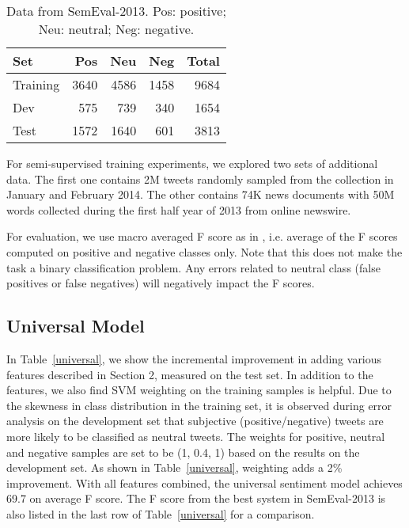 \documentclass[11pt]{article}
\begin{document}
\begin{table}[h]
\begin{center}
\begin{tabular}{|l|r|r|r|r|}
\hline \bf Set & \bf Pos & \bf Neu & \bf Neg & \bf Total \\ \hline\hline
Training & 3640 & 4586 & 1458 & 9684 \\ \hline
Dev & 575 & 739 & 340 & 1654 \\ \hline
Test & 1572 & 1640 & 601 & 3813 \\ \hline
\end{tabular}
\end{center}
\caption{\label{data} Data from SemEval-2013. Pos: positive; Neu: neutral; Neg: negative.}
\end{table}

For semi-supervised training experiments, we
explored two sets of additional data. The first one contains 2M tweets randomly sampled from the collection in January 
and February 2014. The other
contains 74K news documents with 50M words collected during the first half year of 2013 from online newswire.

For evaluation, we use macro averaged F score as in \cite{SemEval:13}, i.e. average of the F scores computed on
positive and negative classes only. Note that this does not make the task a binary classification problem.
Any errors related to neutral class (false positives or false negatives) will negatively impact the F scores.

\subsection{Universal Model}
In Table~\ref{universal}, we show the incremental improvement in adding various features described in Section 2,
measured on the test set. 
In addition to the features, we also find SVM weighting on the training samples is helpful. Due to the
skewness in class distribution in the training set, it is observed during error analysis on the development
set that subjective (positive/negative) tweets are more likely to be classified as neutral tweets. The
weights for positive, neutral and negative samples are set to be (1, 0.4, 1) based on the
results on the development set. As shown in Table~\ref{universal}, weighting adds a 2\% improvement.
With all features combined, the universal sentiment model achieves 69.7 on average F score.
The F score from the best system in SemEval-2013 \cite{Mohammad:13} is also listed in the last row of
Table~\ref{universal} for a comparison.
\end{document}
